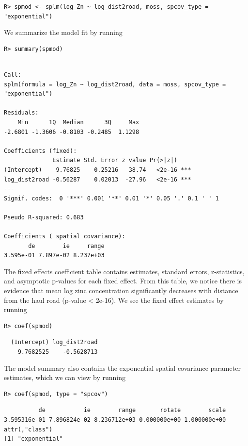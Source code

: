 \documentclass[10pt,letterpaper]{article}
\begin{document}
\begin{verbatim}
R> spmod <- splm(log_Zn ~ log_dist2road, moss, spcov_type = "exponential")
\end{verbatim}

We summarize the model fit by running

\begin{verbatim}
R> summary(spmod)
\end{verbatim}

\begin{verbatim}

Call:
splm(formula = log_Zn ~ log_dist2road, data = moss, spcov_type = "exponential")

Residuals:
    Min      1Q  Median      3Q     Max 
-2.6801 -1.3606 -0.8103 -0.2485  1.1298 

Coefficients (fixed):
              Estimate Std. Error z value Pr(>|z|)    
(Intercept)    9.76825    0.25216   38.74   <2e-16 ***
log_dist2road -0.56287    0.02013  -27.96   <2e-16 ***
---
Signif. codes:  0 '***' 0.001 '**' 0.01 '*' 0.05 '.' 0.1 ' ' 1

Pseudo R-squared: 0.683

Coefficients ( spatial covariance):
       de        ie     range 
3.595e-01 7.897e-02 8.237e+03 
\end{verbatim}

The fixed effects coefficient table contains estimates, standard errors,
z-statistics, and asymptotic p-values for each fixed effect. From this
table, we notice there is evidence that mean log zinc concentration
significantly decreases with distance from the haul road (p-value
\textless{} 2e-16). We see the fixed effect estimates by running

\begin{verbatim}
R> coef(spmod)
\end{verbatim}

\begin{verbatim}
  (Intercept) log_dist2road 
    9.7682525    -0.5628713 
\end{verbatim}

The model summary also contains the exponential spatial covariance
parameter estimates, which we can view by running

\begin{verbatim}
R> coef(spmod, type = "spcov")
\end{verbatim}

\begin{verbatim}
          de           ie        range       rotate        scale 
3.595316e-01 7.896824e-02 8.236712e+03 0.000000e+00 1.000000e+00 
attr(,"class")
[1] "exponential"
\end{verbatim}
\end{document}
